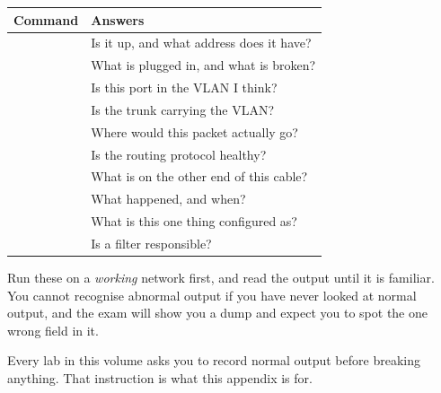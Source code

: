 \begin{longtable}{@{}L{7.4cm}L{7.9cm}@{}}
\toprule
{}
\textbf{Command} & \textbf{Answers} \\
\midrule
\endhead
{} & Is it up, and what address does it have? \\
 & What is plugged in, and what is broken? \\
 & Is this port in the VLAN I think? \\
 & Is the trunk carrying the VLAN? \\
 & Where would this packet actually go? \\
 & Is the routing protocol healthy? \\
 & What is on the other end of this cable? \\
 & What happened, and when? \\
 & What is this one thing configured
as? \\
 & Is a filter responsible? \\
\bottomrule
\end{longtable}

\begin{alertbox}
Run these on a \emph{working} network first, and read the output until it is
familiar. You cannot recognise abnormal output if you have never looked at normal
output, and the exam will show you a  dump and expect you to spot the
one wrong field in it.

Every lab in this volume asks you to record normal output before breaking
anything. That instruction is what this appendix is for.
\end{alertbox}
